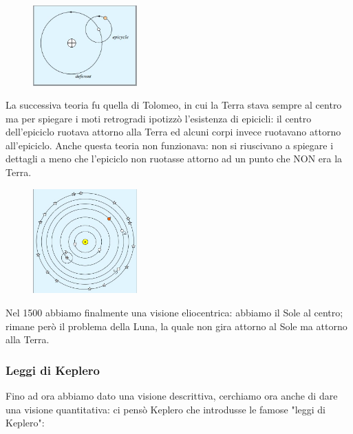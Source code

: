 \begin{minipage}{0.295\textwidth}
    \begin{figure}[H]
        \centering
        \includegraphics[width=4cm]{2dic/Modello_Planetario_Tolomeo.jpg}
        \label{fig:MPT}
    \end{figure}
\end{minipage}
\begin{minipage}{0.6\textwidth}
    La successiva teoria fu quella di Tolomeo, in cui la Terra stava sempre al centro ma per spiegare i moti retrogradi ipotizzò l'esistenza di epicicli: il centro dell'epiciclo ruotava attorno alla Terra ed alcuni corpi invece ruotavano attorno all'epiciclo. Anche questa teoria non funzionava: non si riuscivano a spiegare i dettagli a meno che l'epiciclo non ruotasse attorno ad un punto che NON era la Terra.
\end{minipage}

\begin{minipage}{0.295\textwidth}
    \begin{figure}[H]
        \centering
        \includegraphics[width=4cm]{2dic/Modello_Eliocentrico.jpg}
        \label{fig:MPE}
    \end{figure}
\end{minipage}
\begin{minipage}{0.6\textwidth}
    Nel 1500 abbiamo finalmente una visione eliocentrica: abbiamo il Sole al centro; rimane però il problema della Luna, la quale non gira attorno al Sole ma attorno alla Terra.
\end{minipage}

\subsubsection{Leggi di Keplero}
Fino ad ora abbiamo dato una visione descrittiva, cerchiamo ora anche di dare una visione quantitativa: ci pensò Keplero che introdusse le famose "leggi di Keplero":

